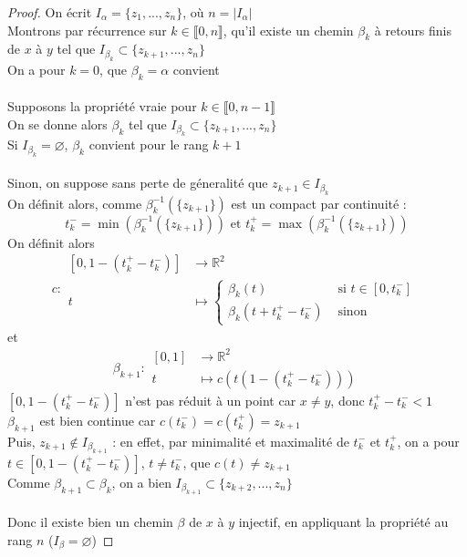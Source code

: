 \documentclass{article}
\begin{document}
\begin{flushleft}
\begin{proof}
    On écrit $I_{\alpha} = \{z_1, ..., z_n\}$, où $n = |I_{\alpha}|$\\
    Montrons par récurrence sur $k \in \llbracket 0, n \rrbracket$, qu'il existe un chemin $\beta_k$ à retours finis de $x$ à $y$
    tel que $I_{\beta_k} \subset \{ z_{k+1}, ..., z_n \}$\\
    On a pour $k = 0$, que $\beta_k = \alpha$ convient
    \\~\\
    Supposons la propriété vraie pour $k \in \llbracket 0, n-1 \rrbracket$\\
    On se donne alors $\beta_k$ tel que $I_{\beta_k} \subset \{ z_{k+1}, ..., z_n \}$\\
    Si $I_{\beta_k} = \varnothing$, $\beta_k$ convient pour le rang $k+1$
    \\~\\
    Sinon, on suppose sans perte de géneralité que $z_{k+1} \in I_{\beta_k}$\\
    On définit alors, comme $\beta_k^{-1}(\{z_{k+1} \})$ est un compact par continuité :
    \[ t^{-}_k = \min(\beta_k^{-1}(\{z_{k+1} \})) \text{ et } t^{+}_k = \max(\beta_k^{-1}(\{z_{k+1} \}))\]
    On définit alors
    \[ c : \begin{array}{cl}
        [0, 1 - (t^{+}_k - t^{-}_k)] &\longrightarrow \mathbb{R}^2\\
        t &\longmapsto \left\{ \begin{array}{cl}
            \beta_k(t) &\text{ si } t \in [0, t^{-}_k]\\
            \beta_k(t + t^{+}_k - t^{-}_k) &\text{ sinon }
        \end{array} \right.
    \end{array} \]
    et
    \[ \beta_{k+1} : \begin{array}{cl}
        [0, 1] &\longrightarrow \mathbb{R}^2\\
        t &\longmapsto c(t(1-(t^{+}_k - t^{-}_k)))
    \end{array}\]
    $[0, 1 - (t^{+}_k - t^{-}_k)]$ n'est pas réduit à un point car $x \neq y$, donc $t^{+}_k - t^{-}_k < 1$\\
    $\beta_{k+1}$ est bien continue car $c(t^{-}_k) = c(t^{+}_k) = z_{k+1}$\\
    Puis, $z_{k+1} \notin I_{\beta_{k+1}}$ : en effet, par minimalité et maximalité de $t^{-}_k$ et $t^{+}_k$,
    on a pour $t \in [0, 1 - (t^{+}_k - t^{-}_k)]$, $t \neq t^{-}_k$, que $c(t) \neq z_{k+1}$\\
    Comme $\beta_{k+1} \subset \beta_k$, on a bien $I_{\beta_{k+1}} \subset \{z_{k+2}, ..., z_n \}$
    \\~\\
    Donc il existe bien un chemin $\beta$ de $x$ à $y$ injectif, en appliquant la propriété au rang $n$ ($I_{\beta} = \varnothing$)


\end{proof}
\end{flushleft}
\end{document}
